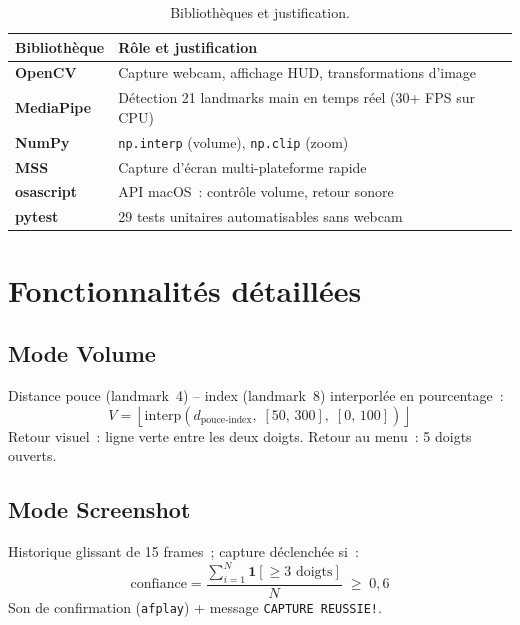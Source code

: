\documentclass[12pt,a4paper]{article}
\begin{document}
\begin{table}[H]
\centering
\caption{Biblioth\`eques et justification.}
\label{tab:libs}
\small
\begin{tabularx}{\textwidth}{>{\bfseries}p{3cm} X}
\toprule
\textbf{Biblioth\`eque} & \textbf{R\^ole et justification} \\
\midrule
OpenCV      & Capture webcam, affichage HUD, transformations d'image \\
MediaPipe   & D\'etection 21 landmarks main en temps r\'eel (30+ FPS sur CPU) \\
NumPy       & \texttt{np.interp} (volume), \texttt{np.clip} (zoom) \\
MSS         & Capture d'\'ecran multi-plateforme rapide \\
osascript   & API macOS~: contr\^ole volume, retour sonore \\
pytest      & 29 tests unitaires automatisables sans webcam \\
\bottomrule
\end{tabularx}
\end{table}

\newpage

\section{Fonctionnalit\'es d\'etaill\'ees}
\label{sec:fonctionnalites}

\subsection{Mode Volume}

Distance pouce (landmark~4) -- index (landmark~8) interporl\'ee en pourcentage~:
\begin{equation}
  V = \left\lfloor \mathrm{interp}(d_{\text{pouce-index}},\;[50,\,300],\;[0,\,100]) \right\rfloor
\end{equation}
Retour visuel~: ligne verte entre les deux doigts. Retour au menu~: 5 doigts ouverts.

\subsection{Mode Screenshot}

Historique glissant de 15 frames~; capture d\'eclench\'ee si~:
\begin{equation}
  \text{confiance} = \frac{\sum_{i=1}^{N} \mathbf{1}[\geq 3\text{ doigts}]}{N} \;\geq\; 0{,}6
\end{equation}
Son de confirmation (\texttt{afplay}) + message \texttt{CAPTURE REUSSIE!}.
\end{document}
